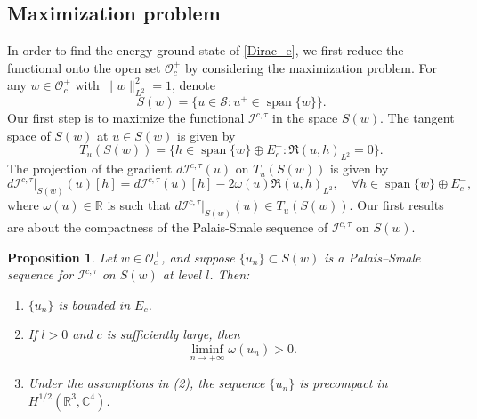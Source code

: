 \documentclass{amsart}
\theoremstyle{plain}
\newtheorem{proposition}[theorem]{Proposition}
\theoremstyle{definition}
\theoremstyle{remark}
\numberwithin{equation}{section} \numberwithin{figure}{section}
\begin{document}

\subsection[]{Maximization problem}

In order to find the energy ground state of \eqref{Dirac_e}, we first reduce the functional onto the open set $\mathcal{O}_c^+$ by considering the maximization problem.
For any $w\in \mathcal{O}_c^+$ with $\|w\|_{L^2}^2=1 $, denote 
$$
S(w) =\{ u\in \mathcal{S}: u^+\in \operatorname{span}\{w\} \}.
$$
Our  first step is to maximize the functional $\mathcal{I}^{c, \tau }$ in the space $S(w)$. The tangent space of $S(w)$ at $u\in S(w)$ is given by $$
T_u(S(w)) =\{h\in \operatorname{span}\{w\}\oplus E_c^-:\Re(u,h)_{L^2}=0 \}.
$$
The projection of the gradient $d \mathcal{I}^{c, \tau }(u)$ on $T_u(S(w))$  is given by
$$
d \mathcal{I}^{c, \tau }|_{S(w)}(u)[ h] = d \mathcal{I}^{c, \tau}(u)[h]- 2\omega(u)\Re(u,h)_{L^2},\quad \forall h\in \operatorname{span}\{w\}\oplus E_c^-,
$$
where $\omega(u)\in \mathbb{R}$ is such that $d \mathcal{I}^{c, \tau }|_{S(w)}(u)\in T_u(S(w)).$
  Our first results are about the compactness of the Palais-Smale sequence of $\mathcal{I}^{c, \tau }$ on $  S(w)$.


  \begin{proposition}\label{prop:3.1}
    Let \( w \in \mathcal{O}_c^+ \), and suppose \( \{u_n\} \subset S(w) \) is a Palais–Smale sequence for \( \mathcal{I}^{c,\tau} \) on \( S(w) \) at level \( l \). Then:
    \begin{enumerate}
      \item[(1)] \( \{u_n\} \) is bounded in \( E_c \).
      \item[(2)] If \( l > 0 \) and \( c \) is sufficiently large, then
            \[
            \liminf_{n \to +\infty} \omega(u_n) > 0.
            \]
      \item[(3)] Under the assumptions in (2), the sequence \( \{u_n\} \) is precompact in \( H^{1/2}(\mathbb{R}^3, \mathbb{C}^4) \).
    \end{enumerate}
    \end{proposition}
    
\end{document}
